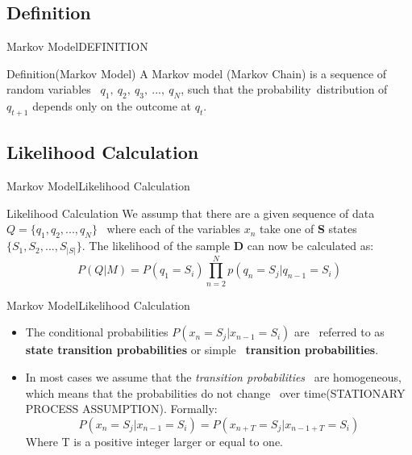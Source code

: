 \documentclass[10pt]{beamer}
\begin{document}
\subsection{Definition}
\begin{frame}{Markov Model}{DEFINITION}
  \begin{block}{Definition(Markov Model)}
     A Markov model (Markov Chain) is a sequence of random variables \ 
     $q_1,\ q_2,\ q_3,\ ...,\ q_N$, such that the probability\
     distribution of $q_{t+1}$ depends only on the outcome at $q_t$.
  \end{block}
\end{frame}

\subsection{Likelihood Calculation}
\begin{frame}{Markov Model}{Likelihood Calculation}
  \begin{block}{Likelihood Calculation}
  We assump that there are a given sequence of data $Q=\{q_1, q_2, ..., q_N\}$ \
  where each of the variables $x_n$ take one of \textbf{S} states $\{S_1, S_2, ..., S_{|S|}\}$.
  The likelihood of the sample \textbf{D} can now be calculated as:\\
        \begin{equation}
            P(Q|M) = P(q_1 = S_i)\displaystyle \prod_{n=2}^{N}p(q_n = S_j | q_{n-1} = S_i)
        \end{equation}
  \end{block}
\end{frame}

\begin{frame}{Markov Model}{Likelihood Calculation}
  \begin{itemize}
    \item The conditional probabilities $P(x_n = S_j | x_{n-1} = S_i)$ are \
          referred to as \textbf{state transition probabilities} or simple \
          \textbf{transition probabilities}. \cite{Anders}
    \item In most cases we assume that the \textit{transition probabilities} \
          are homogeneous, which means that the probabilities do not change \
          over time(STATIONARY PROCESS ASSUMPTION). \cite{Anders} Formally:
          \begin{equation}
               P(x_n = S_j|x_{n-1} = S_i) = P(x_{n+T} = S_j|x_{n-1+T} = S_i)
          \end{equation}
          Where T is a positive integer larger or equal to one.
  \end{itemize}
\end{frame}
\end{document}
